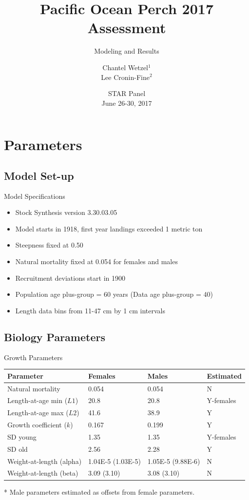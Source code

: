 \documentclass[pdf]{beamer}\usepackage[]{graphicx}\usepackage[]{color}
\title{Pacific Ocean Perch 2017 Assessment}
\subtitle{Modeling and Results}
\author{Chantel Wetzel$^{1}$\\
        Lee Cronin-Fine$^{2}$}
\institute[NWFSC]{
Northwest Fisheries Science Center$^1$ \\
University of Washington$^2$ \\
\medskip
}
\date{{\footnotesize STAR Panel \\ June 26-30, 2017}}
\begin{document}
\begin{frame}
  \titlepage
\end{frame}


\section{Parameters}
\subsection{Model Set-up}
\begin{frame}{Model Specifications}
  \begin{itemize}
    \item Stock Synthesis version 3.30.03.05
    \item Model starts in 1918, first year landings exceeded 1 metric ton
    \item Steepness fixed at 0.50
    \item Natural mortality fixed at 0.054 for females and males
    \item Recruitment deviations start in 1900
    \item Population age plus-group = 60 years (Data age plus-group = 40)
    \item Length data bins from 11-47 cm by 1 cm intervals
  \end{itemize}
\end{frame}

\subsection{Biology Parameters}
\begin{frame}{Growth Parameters}
  \begin{table}[ht]
  \small
  \centering
  \begin{tabular}{p{1.5in}p{0.6in}p{0.6in}p{0.6in}}
  Parameter & Females & Males & Estimated  \\ 
  \hline
  Natural mortality  & 0.054 & 0.054 & N \\
  Length-at-age min ($L1$) & 20.8  & 20.8 & Y-females \\
  Length-at-age max ($L2$) & 41.6  & 38.9 & Y \\
  Growth coefficient ($k$) & 0.167 & 0.199 & Y \\
  SD young & 1.35 & 1.35 & Y-females \\
  SD old   & 2.56 & 2.28 & Y \\
  Weight-at-length (alpha) & 1.04E-5 (1.03E-5)& 1.05E-5 (9.88E-6)& N \\
  Weight-at-length (beta)  & 3.09 (3.10) & 3.08 (3.10)& N \\
  \hline
  \end{tabular}
  \end{table}
  * Male parameters estimated as offsets from female parameters.
\end{frame}
\end{document}
